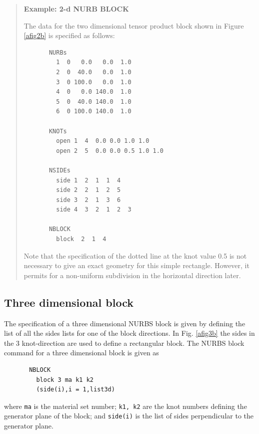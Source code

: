 \begin{quote}
\noindent
\textbf{Example: 2-d NURB BLOCK}

The data for the two dimensional tensor product block shown in
Figure \ref{afig2b} is specified as follows:

\begin{minipage}{\textwidth}
\setlength{\baselineskip}{12pt}
\begin{verbatim}
       NURBs
         1  0   0.0   0.0  1.0
         2  0  40.0   0.0  1.0
         3  0 100.0   0.0  1.0
         4  0   0.0 140.0  1.0
         5  0  40.0 140.0  1.0
         6  0 100.0 140.0  1.0

       KNOTs
         open 1  4  0.0 0.0 1.0 1.0
         open 2  5  0.0 0.0 0.5 1.0 1.0

       NSIDEs
         side 1  2  1  1  4
         side 2  2  1  2  5
         side 3  2  1  3  6
         side 4  3  2  1  2  3

       NBLOCK
         block  2  1  4

\end{verbatim}
\setlength{\baselineskip}{14pt}
\end{minipage}

Note that the specification of the dotted line at the knot value 0.5 is
not necessary to give an exact geometry for this simple rectangle.  However,
it permits for a non-uniform subdivision in the horizontal direction later.
\end{quote}

\subsection{Three dimensional block}

\setlength{\baselineskip}{16pt}
The specification of a three dimensional NURBS block is given by defining the
list of all the sides lists for one of the block directions.
In Fig. \ref{afig3b} the sides in the 3 knot-direction are used to define
a rectangular block.  The NURBS block command for a three dimensional block
is given as

\setlength{\baselineskip}{12pt}
\begin{verbatim}
       NBLOCK
         block 3 ma k1 k2
         (side(i),i = 1,list3d)
\end{verbatim}
\setlength{\baselineskip}{14pt}
where \texttt{ma} is the material set number; \texttt{k1, k2} are the knot
numbers defining the generator plane of the block; and \texttt{side(i)} is the
list of sides perpendicular to the generator plane.

